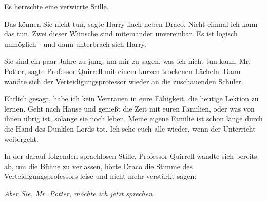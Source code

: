 Es herrschte eine verwirrte Stille.

\glqq{}Das können Sie nicht tun\grqq{}, sagte Harry flach neben Draco. \glqq{}
Nicht einmal ich kann das tun. Zwei dieser Wünsche sind miteinander unvereinbar.
Es ist logisch unmöglich -\grqq{} und dann unterbrach sich Harry.

\glqq{}Sie sind ein paar Jahre zu jung, um mir zu sagen, was ich nicht tun kann,
Mr. Potter\grqq{}, sagte Professor Quirrell mit einem kurzen trockenen Lächeln.
Dann wandte sich der Verteidigungsprofessor wieder an die zuschauenden Schüler.

\glqq{}Ehrlich gesagt, habe ich kein Vertrauen in eure Fähigkeit, die heutige
Lektion zu lernen. Geht nach Hause und genießt die Zeit mit euren Familien, oder
was von ihnen übrig ist, solange sie noch leben. Meine eigene Familie ist schon
lange durch die Hand des Dunklen Lords tot. Ich sehe euch alle wieder, wenn der
Unterricht weitergeht.\grqq{}

In der darauf folgenden sprachlosen Stille, Professor Quirrell wandte sich
bereits ab, um die Bühne zu verlassen, hörte Draco die Stimme des
Verteidigungsprofessors leise und nicht mehr verstärkt sagen:

\glqq{}\emph{Aber Sie, Mr. Potter, möchte ich jetzt sprechen.}\grqq{}

